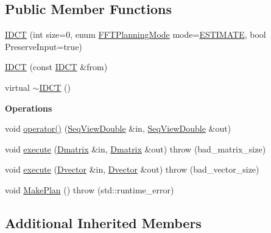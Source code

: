 \subsection*{Public Member Functions}
\begin{DoxyCompactItemize}
\item 
\hyperlink{classtsa_1_1_i_d_c_t_abf50b114d212adc9d1c977db4eee9053}{I\+D\+CT} (int size=0, enum \hyperlink{namespacetsa_a217e07ef78939f88b22c8428ac96b1ae}{F\+F\+T\+Planning\+Mode} mode=\hyperlink{namespacetsa_a217e07ef78939f88b22c8428ac96b1aea2762be66fb6f3e4772c7f4cc162b9750}{E\+S\+T\+I\+M\+A\+TE}, bool Preserve\+Input=true)
\item 
\hyperlink{classtsa_1_1_i_d_c_t_a6747b5a2d41cdd4451e545ff129d5c13}{I\+D\+CT} (const \hyperlink{classtsa_1_1_i_d_c_t}{I\+D\+CT} \&from)
\item 
virtual \hyperlink{classtsa_1_1_i_d_c_t_ae7caa3512626cc407690fc0b9f7eaafb}{$\sim$\+I\+D\+CT} ()
\end{DoxyCompactItemize}
\begin{Indent}\textbf{ Operations}\par
\begin{DoxyCompactItemize}
\item 
void \hyperlink{classtsa_1_1_i_d_c_t_a9c1f5bc33388179e85f00882022cf567}{operator()} (\hyperlink{namespacetsa_ac599574bcc094eda25613724b8f3ca9e}{Seq\+View\+Double} \&in, \hyperlink{namespacetsa_ac599574bcc094eda25613724b8f3ca9e}{Seq\+View\+Double} \&out)
\item 
void \hyperlink{classtsa_1_1_i_d_c_t_aef29c6eb84ce3367e90eb66b3e40c005}{execute} (\hyperlink{namespacetsa_ad260cd21c1891c4ed391fe788569aba4}{Dmatrix} \&in, \hyperlink{namespacetsa_ad260cd21c1891c4ed391fe788569aba4}{Dmatrix} \&out)  throw (bad\+\_\+matrix\+\_\+size)
\item 
void \hyperlink{classtsa_1_1_i_d_c_t_a8bb130d39013848471a191f45e93fb09}{execute} (\hyperlink{namespacetsa_a8900fb03d849baf447a1a0efe2561fb2}{Dvector} \&in, \hyperlink{namespacetsa_a8900fb03d849baf447a1a0efe2561fb2}{Dvector} \&out)  throw (bad\+\_\+vector\+\_\+size)
\item 
void \hyperlink{classtsa_1_1_i_d_c_t_a3add06359e79507105820496b324ad7a}{Make\+Plan} ()  throw (std\+::runtime\+\_\+error)
\end{DoxyCompactItemize}
\end{Indent}
\subsection*{Additional Inherited Members}



